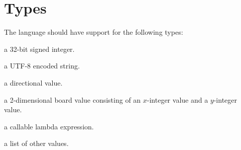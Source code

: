 \section{Types}

The language should have support for the following types:

\begin{description}[noitemsep]
\item[Integer] a 32-bit signed integer.
\item[String] a UTF-8 encoded string.
\item[Direction] a directional value.
\item[Coordinate] a 2-dimensional board value consisting of an $x$-integer value and
a $y$-integer value.
\item[Lambda] a callable lambda expression.
\item[List] a list of other values.
\end{description}
